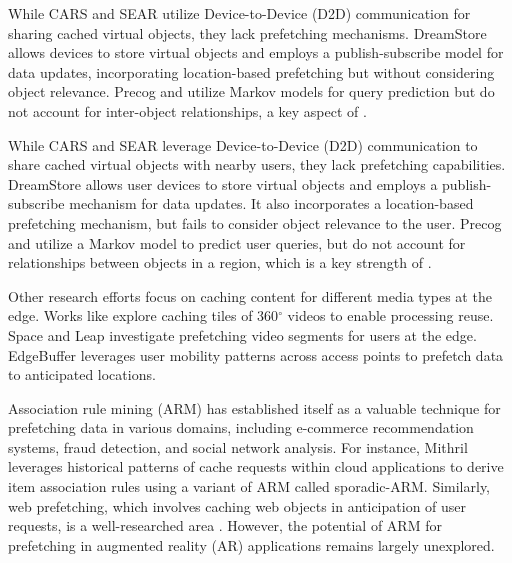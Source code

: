 
    While CARS \cite{bib:carsar} and SEAR \cite{bib:sear} utilize Device-to-Device (D2D) communication for sharing cached virtual objects, they lack prefetching mechanisms. DreamStore \cite{bib:dreamstore} allows devices to store virtual objects and employs a publish-subscribe model for data updates, incorporating location-based prefetching but without considering object relevance. Precog \cite{bib:precog} and \cite{bib:arwmnedge} utilize Markov models for query prediction but do not account for inter-object relationships, a key aspect of \spaarc{}.
    
    While CARS \cite{bib:carsar} and SEAR \cite{bib:sear} leverage Device-to-Device (D2D) communication to share cached virtual objects with nearby users, they lack prefetching capabilities. DreamStore \cite{bib:dreamstore} allows user devices to store virtual objects and employs a publish-subscribe mechanism for data updates. It also incorporates a location-based prefetching mechanism, but fails to consider object relevance to the user. Precog \cite{bib:precog} and \cite{bib:arwmnedge} utilize a Markov model to predict user queries, but do not account for relationships between objects in a region, which is a key strength of \spaarc{}.

    Other research efforts focus on caching content for different media types at the edge. Works like \cite{bib:coopec, bib:tile,bib:cubist} explore caching tiles of 360$^\circ$ videos to enable processing reuse. Space \cite{bib:space} and Leap \cite{bib:leap} investigate prefetching video segments for users at the edge. EdgeBuffer \cite{bib:edgebuffer} leverages user mobility patterns across access points to prefetch data to anticipated locations.

    Association rule mining (ARM) \cite{bib:armorig, bib:arm} has established itself as a valuable technique for prefetching data in various domains, including e-commerce recommendation systems, fraud detection, and social network analysis. For instance, Mithril \cite{bib:mithril} leverages historical patterns of cache requests within cloud applications to derive item association rules using a variant of ARM called sporadic-ARM. Similarly, web prefetching, which involves caching web objects in anticipation of user requests, is a well-researched area \cite{bib:webcache}. However, the potential of ARM for prefetching in augmented reality (AR) applications remains largely unexplored.